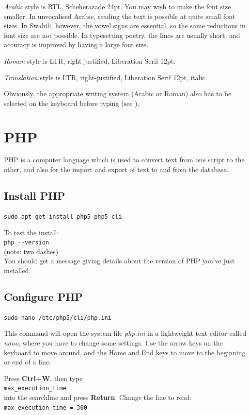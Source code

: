\textit{Arabic} style is RTL, Scheherazade 24pt.  You may wish to make the font size smaller. In unvocalised Arabic, reading the text is possible at quite small font sizes. In Swahili, however, the vowel signs are essential, so the same reductions in font size are not possible.  In typesetting poetry, the lines are usually short, and accuracy is improved by having a large font size.

\textit{Roman} style is LTR, right-justified, Liberation Serif 12pt.

\textit{Translation} style is LTR, right-justified, Liberation Serif 12pt, italic.  

Obviously, the appropriate writing system (Arabic or Roman) also has to be selected on the keyboard before typing (see ).


\section{PHP}

PHP is a computer language which is used to convert text from one script to the other, and also for the import and export of text to and from the database.

\subsection{Install PHP}

\verb|sudo apt-get install php5 php5-cli|

To test the install:\\
\verb|php --version|\\
(note: two dashes)\\
You should get a message giving details about the version of PHP you've just installed.

\subsection{Configure PHP}

\verb|sudo nano /etc/php5/cli/php.ini|

This command will open the system file \textit{php.ini} in a lightweight text editor called \textit{nano}, where you have to change some settings.  Use the arrow keys on the keyboard to move around, and the Home and End keys to move to the beginning or end of a line.

Press \textbf{Ctrl+W}, then type\\
\verb|max_execution_time|\\
into the searchline and press \textbf{Return}. Change the line to read:\\
\verb|max_execution_time = 300|

